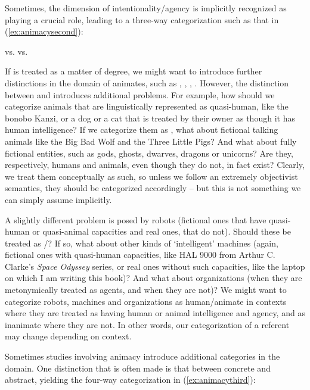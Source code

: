 Sometimes, the dimension of intentionality/agency is implicitly recognized as playing a crucial role, leading to a three-way categorization such as that in (\ref{ex:animacysecond}):

\begin{exe}
\ex {} vs.  vs. 
\label{ex:animacysecond}
\end{exe}

If  is treated as a matter of degree, we might want to introduce further distinctions in the domain of animates, such as , , , . However, the distinction between  and  introduces additional problems. For example, how should we categorize animals that are linguistically represented as quasi-human, like the bonobo Kanzi, or a dog or a cat that is treated by their owner as though it has human intelligence? If we categorize them as , what about fictional talking animals like the Big Bad Wolf and the Three Little Pigs? And what about fully fictional entities, such as gods, ghosts, dwarves, dragons or unicorns? Are they, respectively, humans and animals, even though they do not, in fact exist? Clearly, we treat them conceptually as such, so unless we follow an extremely objectivist semantics, they should be categorized accordingly -- but this is not something we can simply assume implicitly.

A slightly different problem is posed by robots (fictional ones that have quasi-human or quasi-animal capacities and real ones, that do not). Should these be treated as /? If so, what about other kinds of `intelligent' machines (again, fictional ones with quasi-human capacities, like HAL 9000 from Arthur C. Clarke's \textit{Space Odyssey} series, or real ones without such capacities, like the laptop on which I am writing this book)? And what about organizations (when they are metonymically treated as agents, and when they are not)? We might want to categorize robots, machines and organizations as human/animate in contexts where they are treated as having human or animal intelligence and agency, and as inanimate where they are not. In other words, our categorization of a referent may change depending on context.

Sometimes studies involving animacy introduce additional categories in the  domain. One distinction that is often made is that between concrete and abstract, yielding the four-way categorization in (\ref{ex:animacythird}):

